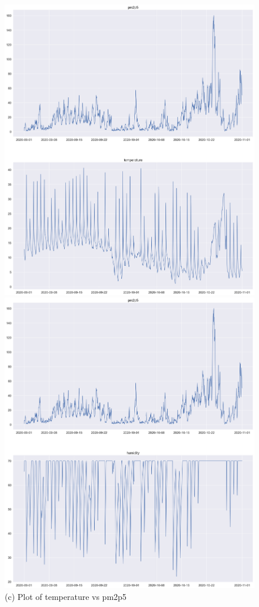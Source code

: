 \documentclass{article}
\begin{document}
  \begin{figure}[h!]
    \centering
    \begin{minipage}[t]{0.4\textwidth}
      \centering
      \includegraphics[scale=0.18]{plottemperature.png}
      \caption{(c) Plot of temperature vs pm2p5}
    \end{minipage}\hfill
    \begin{minipage}[t]{0.4\textwidth}
      \centering
      \includegraphics[scale=0.18]{humidityplot.png}

\end{minipage}
\end{figure}
\end{document}
